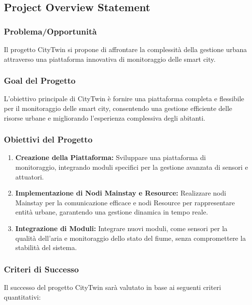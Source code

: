 \subsection{Project Overview Statement}

\subsubsection{Problema/Opportunità}

Il progetto CityTwin si propone di affrontare la complessità della gestione urbana attraverso una piattaforma innovativa di monitoraggio delle smart city.

\subsubsection{Goal del Progetto}

L'obiettivo principale di CityTwin è fornire una piattaforma completa e flessibile per il monitoraggio delle smart city, consentendo una gestione efficiente delle risorse urbane e migliorando l'esperienza complessiva degli abitanti.

\subsubsection{Obiettivi del Progetto}

\begin{enumerate}
  \item \textbf{Creazione della Piattaforma:} Sviluppare una piattaforma di monitoraggio, integrando moduli specifici per la gestione avanzata di sensori e attuatori.
  
  \item \textbf{Implementazione di Nodi Mainstay e Resource:} Realizzare nodi Mainstay per la comunicazione efficace e nodi Resource per rappresentare entità urbane, garantendo una gestione dinamica in tempo reale.
  
  \item \textbf{Integrazione di Moduli:} Integrare nuovi moduli, come sensori per la qualità dell'aria e monitoraggio dello stato del fiume, senza compromettere la stabilità del sistema.
\end{enumerate}

\subsubsection{Criteri di Successo}

Il successo del progetto CityTwin sarà valutato in base ai seguenti criteri quantitativi:

